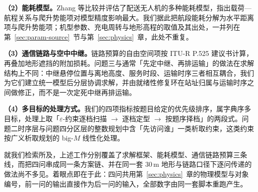\noindent\textbf{（2）能耗模型。}Zhang 等\cite{zhang2021energy}比较并评估了配送无人机的多种能耗模型，指出载荷—航程关系与爬升势能项对模型精度影响最大。我们据此把航段能耗分解为水平距离项与爬升势能项；机型参数、充电周转与地形高程的取值及其出处，一并列在第~\ref{sec:param-source}~节与第~\ref{sec:physics}~章，此处不重复。

\noindent\textbf{（3）通信链路与空中中继。}链路预算的自由空间项按 ITU-R P.525 建议书\cite{itu2024p525}计算，再叠加地形遮挡的附加损耗。问题三与通常「先定中继、再排运输」的做法在求解结构上不同：中继悬停位置与离地高度、服务时段、运输时序三者相互耦合，我们为它们建立统一模型后分层协调求解，并由就绪性修复环在站址归属与运输时序之间做修正，而不是一次定死中继再排运输。

\noindent\textbf{（4）多目标的处理方式。}我们的四项指标按题目给定的优先级排序，属字典序多目标，处理上取「$\varepsilon$-约束逐档扫描 $\to$ 逐档定型 $\to$ 按题序择档」的两段式。问题二时序层与问题四分区层的整数规划中含「先访问谁」一类析取约束，这类约束按广义析取规划\cite{grossmann2011generalized}的 big-$M$ 线性化处理。

\noindent 就我们检索所及，上述工作分别覆盖了求解框架、能耗模型、通信链路预算三条线，而把四问串成同一条方案链、并在同一套 30\,m 地形与链路口径下逐问传递的做法尚不多见。着眼点即在于此：四问共用第~\ref{sec:physics}~章的物理模型与对象编号，前一问的输出直接作为后一问的输入，全部数字由同一套脚本重跑产生。
